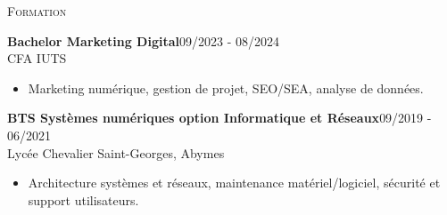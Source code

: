 \documentclass[11pt,a4paper]{article}
\newcommand{\headright}[1]{\vspace*{2.5ex}\textsc{\Large\color{cvblue}#1}\par%
  \vspace*{-2ex}{\color{cvblue}\hrulefill}\par}
\begin{document}
\begin{minipage}[t]{0.56\textwidth}
  \headright{Formation}
  \colorbox{maincolor}{%
  \begin{minipage}{\linewidth}
    \noindent
    \textbf{Bachelor Marketing Digital}\hfill 09/2023 - 08/2024\\
    CFA IUTS\\[-0.3em]
    \begin{itemize}[leftmargin=*]
      \item Marketing numérique, gestion de projet, SEO/SEA, analyse de données.
    \end{itemize}
  \end{minipage}}

\vspace{3mm}

\colorbox{maincolor}{%
  \begin{minipage}{\linewidth}
    \noindent
    \textbf{BTS Systèmes numériques option Informatique et Réseaux}\hfill 09/2019 - 06/2021\\
    Lycée Chevalier Saint-Georges, Abymes\\[-0.3em]
    \begin{itemize}[leftmargin=*]
      \item Architecture systèmes et réseaux, maintenance matériel/logiciel, sécurité et support utilisateurs.
    \end{itemize}
  \end{minipage}}

\end{minipage}
\end{document}

